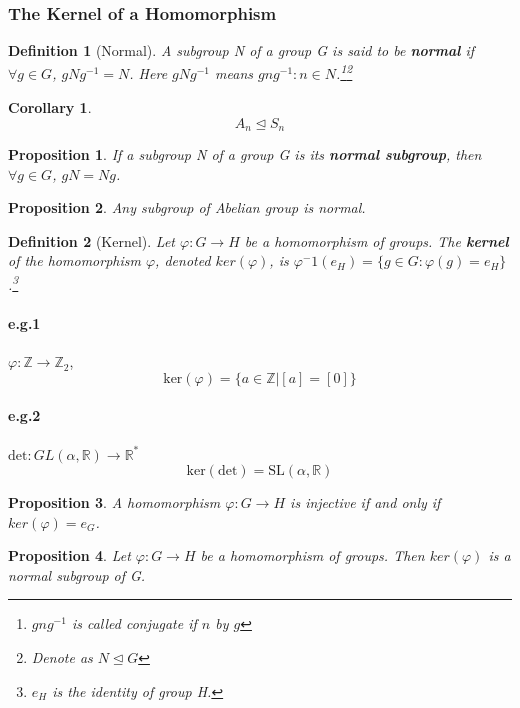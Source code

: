 \documentclass[12pt]{article}
\newtheorem{definition}{Definition}[subsection]
\newtheorem{proposition}{Proposition}[subsection]
\newtheorem{corollary}{Corollary}[subsection]
\begin{document}
    \subsubsection{The Kernel of a Homomorphism}
    \begin{definition}[Normal]
        A subgroup N of a group G is said to be \textbf{normal} if $\forall g \in G$, $gNg^{-1}=N$. Here $gNg^{-1}$ means ${gng^{-1} : n \in N}$.\footnote{$gng^{-1}$ is called conjugate if $n$ by $g$}\footnote{Denote as $N \trianglelefteq G$}
    \end{definition}
    \begin{corollary}
    	\[A_n \trianglelefteq S_n\]
    \end{corollary}
    \begin{proposition}
        If a subgroup N of a group G is its \textbf{normal subgroup}, then $\forall g \in G$, $gN = Ng$.
    \end{proposition}
    
    \begin{proposition}
    	Any subgroup of Abelian group is normal.
    \end{proposition}

    \begin{definition}[Kernel]
        Let $\varphi: G \rightarrow H$ be a homomorphism of groups. The \textbf{kernel} of the homomorphism $\varphi$, denoted $ker(\varphi)$, is $\varphi^-1(e_H) = \{g \in G: \varphi(g) = e_H\}$.\footnote{$e_H$ is the identity of group H.}
    \end{definition}
    \paragraph{e.g.1}
    $\varphi: \mathbb{Z} \rightarrow \mathbb{Z}_2$, \[\mathrm{ker}(\varphi) = \{a \in \mathbb{Z} | [a] = [0]\}\]
    \paragraph{e.g.2}
    $\mathrm{det}: GL(\alpha, \mathbb{R}) \rightarrow \mathbb{R}^*$
    \[\mathrm{ker}(\mathrm{det}) = \mathrm{SL}(\alpha, \mathbb{R})\]
    \begin{proposition}
        A homomorphism $\varphi: G \rightarrow H$ is injective if and only if $ker(\varphi) = {e_G}$.
    \end{proposition}
    \begin{proposition}
        Let $\varphi: G \rightarrow H$ be a homomorphism of groups. Then $ker(\varphi)$ is a normal subgroup of G.
    \end{proposition}
\end{document}
